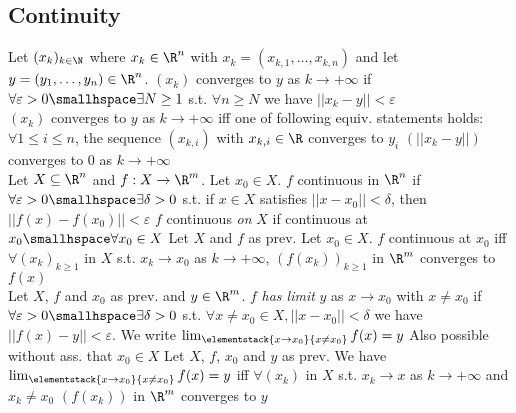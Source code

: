 \subsection{Continuity}
 Let $(x_k)_{k \in \N}$ where $x_k \in \R^n$ with $x_k = (x_{k, 1}, \ldots, x_{k, n})$ and let $y = (y_1, \ldots, y_n) \in \R^n$.
$(x_k)$ converges to $y$ as $k \rightarrow +\infty$ if $\forall \varepsilon > 0 \smallhspace \exists N \geq 1$ s.t. $\forall n \geq N$ we have $||x_k - y|| < \varepsilon$\\
\shortlemma $(x_k)$ converges to $y$ as $k \rightarrow +\infty$ iff one of following equiv. statements holds:
 $\forall 1 \leq i \leq n$, the sequence $(x_{k, i})$ with $x_{k, i} \in \R$ converges to $y_i$
 $(||x_k - y||)$ converges to $0$ as $k \rightarrow +\infty$\\
 Let $X \subseteq \R^n$ and $f: X \rightarrow \R^m$.
 Let $x_0 \in X$. $f$ continuous in $\R^n$ if $\forall \varepsilon > 0 \smallhspace \exists \delta > 0$ s.t. if $x \in X$ satisfies $||x - x_0|| < \delta$,
then $||f(x) - f(x_0)|| < \varepsilon$
 $f$ continuous \textit{on} $X$ if continuous at $x_0 \smallhspace \forall x_0 \in X$
\shortproposition Let $X$ and $f$ as prev. Let $x_0 \in X$. $f$ continuous at $x_0$ iff $\forall (x_k)_{k \geq 1}$ in $X$ s.t.
$x_k \rightarrow x_0$ as $k \rightarrow +\infty$, $(f(x_k))_{k \geq 1}$ in $\R^m$ converges to $f(x)$\\
 Let $X$, $f$ and $x_0$ as prev. and $y \in \R^m$. $f$ \textit{has limit} $y$ as $x \rightarrow x_0$ with $x \neq x_0$ if
$\forall \varepsilon > 0 \smallhspace \exists \delta > 0$ s.t. $\forall x \neq x_0 \in X, ||x - x_0|| < \delta$ we have $||f(x) - y|| < \varepsilon$.
We write $\lim_{\elementstack{x \rightarrow x_0}{x \neq x_0}} f(x) = y$
\shortremark Also possible without ass. that $x_0 \in X$
\shortproposition Let $X$, $f$, $x_0$ and $y$ as prev. We have $\lim_{\elementstack{x \rightarrow x_0}{x \neq x_0}} f(x) = y$
iff $\forall (x_k)$ in $X$ s.t. $x_k \rightarrow x$ as $k \rightarrow +\infty$ and $x_k \neq x_0$ $(f(x_k))$ in $\R^m$ converges to $y$
